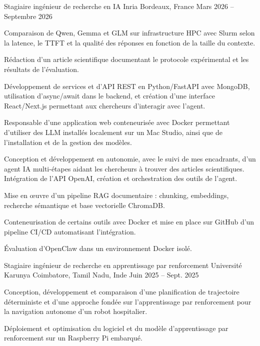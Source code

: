 
\begin{cventries}
  \cventry
    {Stagiaire ingénieur de recherche en IA}
    {Inria}
    {Bordeaux, France}
    {Mars 2026 -- Septembre 2026}
    {
      \begin{cvitems}
        \item {Comparaison de Qwen, Gemma et GLM sur infrastructure HPC avec Slurm selon la latence, le TTFT et la qualité des réponses en fonction de la taille du contexte.}
        \item {Rédaction d’un article scientifique documentant le protocole expérimental et les résultats de l’évaluation.}
        \item {Développement de services et d’API REST en Python/FastAPI avec MongoDB, utilisation d’async/await dans le backend, et création d’une interface React/Next.js permettant aux chercheurs d’interagir avec l’agent.}
        \item {Responsable d’une application web conteneurisée avec Docker permettant d’utiliser des LLM installés localement sur un Mac Studio, ainsi que de l’installation et de la gestion des modèles.}
        \item {Conception et développement en autonomie, avec le suivi de mes encadrants, d’un agent IA multi-étapes aidant les chercheurs à trouver des articles scientifiques. Intégration de l’API OpenAI, création et orchestration des outils de l’agent.}
        \item {Mise en œuvre d’un pipeline RAG documentaire : chunking, embeddings, recherche sémantique et base vectorielle ChromaDB.}
        \item {Conteneurisation de certains outils avec Docker et mise en place sur GitHub d’un pipeline CI/CD automatisant l’intégration.}
        \item {Évaluation d’OpenClaw dans un environnement Docker isolé.}
      \end{cvitems}
    }

  \cventry
    {Stagiaire ingénieur de recherche en apprentissage par renforcement}
    {Université Karunya}
    {Coimbatore, Tamil Nadu, Inde}
    {Juin 2025 -- Sept. 2025}
    {
      \begin{cvitems}
        \item {Conception, développement et comparaison d’une planification de trajectoire déterministe et d’une approche fondée sur l’apprentissage par renforcement pour la navigation autonome d’un robot hospitalier.}
        \item {Déploiement et optimisation du logiciel et du modèle d’apprentissage par renforcement sur un Raspberry Pi embarqué.}
      \end{cvitems}
    }
\end{cventries}
